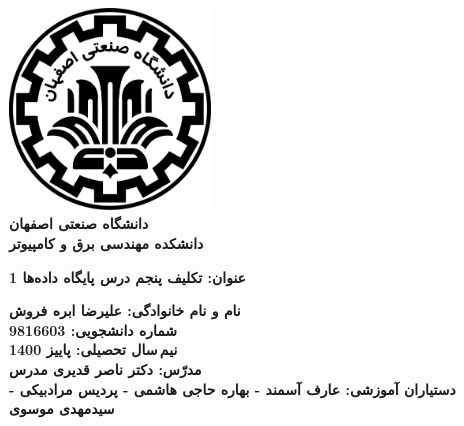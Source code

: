 \begin{titlepage}
\begin{center}
\includegraphics[width=0.4\textwidth]{figures/IUT Logo.png}\\
        
\LARGE
\textbf{دانشگاه صنعتی اصفهان}\\
\textbf{دانشکده مهندسی برق و کامپیوتر}\\
        
\vfill
        
\huge
\textbf{عنوان: تکلیف پنجم درس پایگاه داده‌ها 1}\\
        
\vfill
        
\LARGE
\textbf{نام و نام خانوادگی: علیرضا ابره فروش}\\
\textbf{شماره دانشجویی: 9816603}\\
\textbf{نیم\,سال تحصیلی: پاییز 1400}\\
\textbf{مدرّس: دکتر ناصر قدیری مدرس}\\
\textbf{دستیاران آموزشی: عارف آسمند - بهاره حاجی هاشمی - پردیس مرادبیکی - سیدمهدی موسوی}\\
\end{center}
\end{titlepage}
